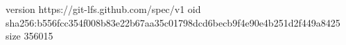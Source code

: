 version https://git-lfs.github.com/spec/v1
oid sha256:b556fcc354f008b83e22b67aa35c01798dcd6becb9f4e90e4b251d2f449a8425
size 356015
